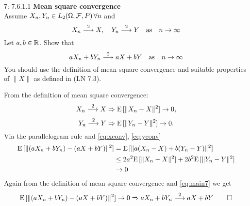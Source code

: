 \documentclass[a4paper,twoside=false,abstract=false,numbers=noenddot,
titlepage=false,headings=small,parskip=half,version=last]{scrartcl}
\begin{document}
\begin{exercise}{7: 7.6.1.1} \textbf{Mean square convergence}\\
    Assume $X_n, Y_n\in \text{$L_2$}(\Omega,\mathcal{F},P)\, \forall n$ and
    \begin{equation}
        X_n \stackrel{2}{\longrightarrow} X, \quad
        Y_n \stackrel{2}{\longrightarrow} Y \quad
        \text{as}\quad n\rightarrow\infty
    \end{equation}
    Let $a, b \in \mathbb{R}$. Show that
    \begin{equation}
        aX_n + bY_n\stackrel{2}{\longrightarrow} aX + bY\quad
        \text{as}\quad n\rightarrow\infty
    \end{equation}
    You should use the definition of mean square convergence and suitable
    properties of $\|X\|$ as defined in (LN 7.3).
\end{exercise}
\begin{solution}
    From the definition of mean square convergence:
    \begin{equation}
        \label{eq:xconv}
        X_n \stackrel{2}{\longrightarrow} X \Rightarrow
        {\rm E}\,[\|X_n-X\|^2] \rightarrow 0,
    \end{equation}
    \begin{equation}
        \label{eq:yconv}
        Y_n \stackrel{2}{\longrightarrow} Y \Rightarrow
        {\rm E}\,[\|Y_n-Y\|^2] \rightarrow 0.
    \end{equation}
    Via the parallelogram rule and \eqref{eq:xconv}, \eqref{eq:yconv}
    \begin{align}  %
        \label{eq:main7}
        \Expected[\|(aX_n+bY_n)-(aX+bY)\|^2] &=
        \Expected[\|a(X_n-X) + b(Y_n-Y)\|^2] \nonumber \\ &\le
        2a^2\Expected[\|X_n-X\|^2]+2b^2\Expected[\|Y_n-Y\|^2] \nonumber \\ &
        \rightarrow 0
    \end{align}
    Again from the definition of mean square convergence and
    \eqref{eq:main7} we get %
    \begin{equation}
        {\rm E}\,[\|(aX_n+bY_n)-(aX+bY)\|^2] \rightarrow 0 \Rightarrow
        aX_n+bY_n \stackrel{2}{\longrightarrow} aX+bY \qed
    \end{equation}
\end{solution}
\pagebreak

\end{document}
